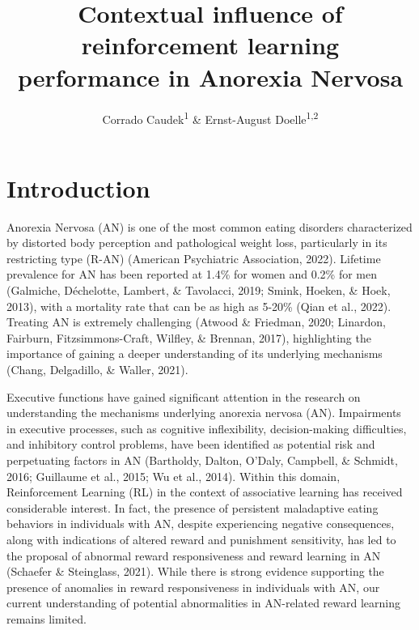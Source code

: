 \documentclass[
  man,floatsintext]{apa6}
\title{Contextual influence of reinforcement learning performance in Anorexia Nervosa}
\author{Corrado Caudek\textsuperscript{1} \& Ernst-August Doelle\textsuperscript{1,2}}
\date{}
\affiliation{\vspace{0.5cm}\textsuperscript{1} Wilhelm-Wundt-University\\\textsuperscript{2} Konstanz Business School}
\begin{document}
\maketitle

\hypertarget{introduction}{%
\section{Introduction}\label{introduction}}

Anorexia Nervosa (AN) is one of the most common eating disorders characterized by distorted body perception and pathological weight loss, particularly in its restricting type (R-AN) (American Psychiatric Association, 2022). Lifetime prevalence for AN has been reported at 1.4\% for women and 0.2\% for men (Galmiche, Déchelotte, Lambert, \& Tavolacci, 2019; Smink, Hoeken, \& Hoek, 2013), with a mortality rate that can be as high as 5-20\% (Qian et al., 2022). Treating AN is extremely challenging (Atwood \& Friedman, 2020; Linardon, Fairburn, Fitzsimmons-Craft, Wilfley, \& Brennan, 2017), highlighting the importance of gaining a deeper understanding of its underlying mechanisms (Chang, Delgadillo, \& Waller, 2021).

Executive functions have gained significant attention in the research on understanding the mechanisms underlying anorexia nervosa (AN). Impairments in executive processes, such as cognitive inflexibility, decision-making difficulties, and inhibitory control problems, have been identified as potential risk and perpetuating factors in AN (Bartholdy, Dalton, O'Daly, Campbell, \& Schmidt, 2016; Guillaume et al., 2015; Wu et al., 2014). Within this domain, Reinforcement Learning (RL) in the context of associative learning has received considerable interest. In fact, the presence of persistent maladaptive eating behaviors in individuals with AN, despite experiencing negative consequences, along with indications of altered reward and punishment sensitivity, has led to the proposal of abnormal reward responsiveness and reward learning in AN (Schaefer \& Steinglass, 2021). While there is strong evidence supporting the presence of anomalies in reward responsiveness in individuals with AN, our current understanding of potential abnormalities in AN-related reward learning remains limited.
\end{document}
